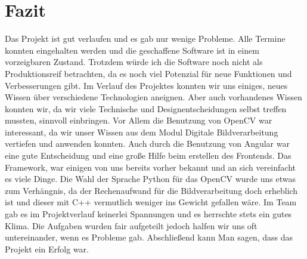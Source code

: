 \chapter{Fazit}
Das Projekt ist gut verlaufen und es gab nur wenige Probleme. Alle Termine konnten eingehalten werden und die geschaffene Software ist in einem vorzeigbaren Zustand. Trotzdem würde ich die Software noch nicht als Produktionsreif betrachten, da es noch viel Potenzial für neue Funktionen und Verbesserungen gibt.
Im Verlauf des Projektes konnten wir uns einiges, neues Wissen über verschiedene Technologien aneignen. Aber auch vorhandenes Wissen konnten wir, da wir viele Technische und Designentscheidungen selbst treffen mussten, sinnvoll einbringen. Vor Allem die Benutzung von OpenCV war interessant, da wir unser Wissen aus dem Modul Digitale Bildverarbeitung vertiefen und anwenden konnten. Auch durch die Benutzung von Angular war eine gute Entscheidung und eine große Hilfe beim erstellen des Frontends. Das Framework, war einigen von uns bereits vorher bekannt und an sich vereinfacht es viele Dinge. 
Die Wahl der Sprache Python für das OpenCV wurde uns etwas zum Verhängnis, da der Rechenaufwand für die Bildverarbeitung doch erheblich ist und dieser mit C++ vermutlich weniger ins Gewicht gefallen wäre. 
Im Team gab es im Projektverlauf keinerlei Spannungen und es herrschte stets ein gutes Klima. Die Aufgaben wurden fair aufgeteilt jedoch halfen wir uns oft untereinander, wenn es Probleme gab.
Abschließend kann Man sagen, dass das Projekt ein Erfolg war.